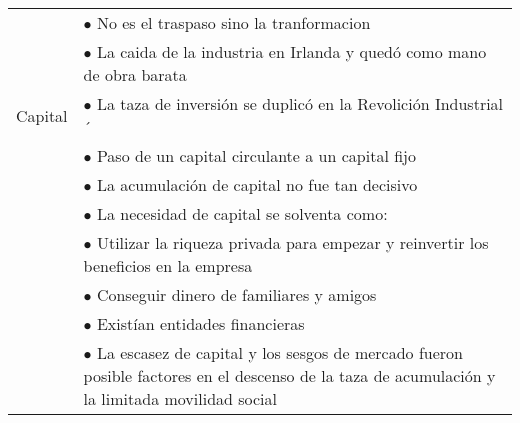 \begin{tabular}{p{3cm}|p{11cm}}
          & $\bullet$ No es el traspaso sino la tranformacion                                                                                                       \\
          & $\bullet$ La caida de la industria en Irlanda y quedó como mano de obra barata                                                                          \\\hline
  Capital & $\bullet$ La taza de inversión se duplicó en la Revolición Industrial                               ´                                                   \\
          & $\bullet$ Paso de un capital circulante a un capital fijo                                                                                               \\
          & $\bullet$ La acumulación de capital no fue tan decisivo                                                                                                 \\
          & $\bullet$ La necesidad de capital se solventa como:                                                                                                     \\
          & \hspace{1cm} $\bullet$ Utilizar la riqueza privada para empezar y reinvertir los beneficios en la empresa                                               \\
          & \hspace{1cm} $\bullet$ Conseguir dinero de familiares y amigos                                                                                          \\
          & \hspace{1cm} $\bullet$ Existían entidades financieras                                                                                                   \\
          & $\bullet$ La escasez de capital y los sesgos de mercado fueron posible factores en el descenso de la taza de acumulación y la limitada movilidad social \\
\end{tabular}
\endgroup




